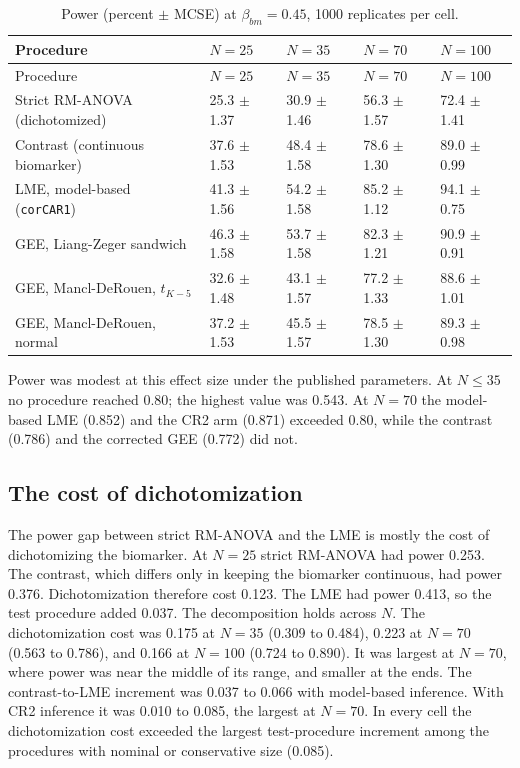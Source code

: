 \documentclass[
  11pt,
]{article}
\begin{document}
\begin{longtable}[]{@{}lllll@{}}
\caption{\label{tab:power} Power (percent \(\pm\) MCSE) at \(\beta_{bm} = 0.45\), 1000 replicates per cell.}\tabularnewline
\toprule\noalign{}
Procedure & \(N = 25\) & \(N = 35\) & \(N = 70\) & \(N = 100\) \\
\midrule\noalign{}
\endfirsthead
\toprule\noalign{}
Procedure & \(N = 25\) & \(N = 35\) & \(N = 70\) & \(N = 100\) \\
\midrule\noalign{}
\endhead
\bottomrule\noalign{}
\endlastfoot
Strict RM-ANOVA (dichotomized) & 25.3 \(\pm\) 1.37 & 30.9 \(\pm\) 1.46 & 56.3 \(\pm\) 1.57 & 72.4 \(\pm\) 1.41 \\
Contrast (continuous biomarker) & 37.6 \(\pm\) 1.53 & 48.4 \(\pm\) 1.58 & 78.6 \(\pm\) 1.30 & 89.0 \(\pm\) 0.99 \\
LME, model-based (\texttt{corCAR1}) & 41.3 \(\pm\) 1.56 & 54.2 \(\pm\) 1.58 & 85.2 \(\pm\) 1.12 & 94.1 \(\pm\) 0.75 \\
GEE, Liang-Zeger sandwich & 46.3 \(\pm\) 1.58 & 53.7 \(\pm\) 1.58 & 82.3 \(\pm\) 1.21 & 90.9 \(\pm\) 0.91 \\
GEE, Mancl-DeRouen, \(t_{K-5}\) & 32.6 \(\pm\) 1.48 & 43.1 \(\pm\) 1.57 & 77.2 \(\pm\) 1.33 & 88.6 \(\pm\) 1.01 \\
GEE, Mancl-DeRouen, normal & 37.2 \(\pm\) 1.53 & 45.5 \(\pm\) 1.57 & 78.5 \(\pm\) 1.30 & 89.3 \(\pm\) 0.98 \\
\end{longtable}

Power was modest at this effect size under the published
parameters. At \(N \le 35\) no procedure reached 0.80; the highest
value was 0.543.
At \(N = 70\) the model-based LME (0.852) and the
CR2 arm (0.871) exceeded 0.80, while the
contrast (0.786) and the corrected GEE
(0.772) did not.

\subsection{The cost of dichotomization}\label{the-cost-of-dichotomization}

The power gap between strict RM-ANOVA and the LME is mostly the
cost of dichotomizing the biomarker. At \(N = 25\) strict RM-ANOVA
had power 0.253. The contrast, which differs
only in keeping the biomarker continuous, had power
0.376. Dichotomization therefore cost
0.123. The LME had power 0.413, so the
test procedure added 0.037. The decomposition holds
across \(N\). The dichotomization cost was 0.175 at
\(N = 35\) (0.309 to
0.484), 0.223 at \(N = 70\)
(0.563 to 0.786),
and 0.166 at \(N = 100\) (0.724 to
0.890). It was largest at \(N = 70\),
where power was near the middle of its range, and smaller at the
ends. The contrast-to-LME increment was 0.037 to 0.066 with
model-based inference. With CR2 inference it was
0.010 to 0.085, the largest at
\(N = 70\). In every cell the dichotomization
cost exceeded the largest test-procedure increment among the
procedures with nominal or conservative size (0.085).
\end{document}

